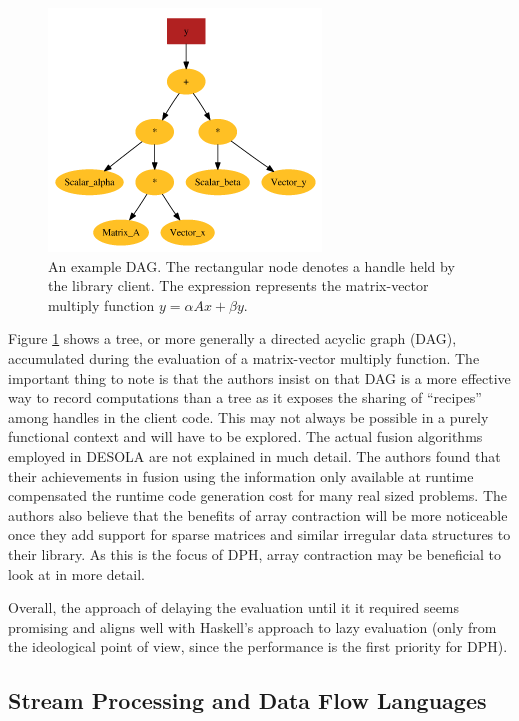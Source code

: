 \documentclass[preamble.tex]{subfiles}
\begin{document}
\begin{figure}
\begin{centering}
\includegraphics{img/DESOLA-running-example}
\par\end{centering}

\caption{\label{fig:Lib:DESOLA-DAG}{An example DAG. The rectangular node denotes a handle held by the library client. The expression represents the matrix-vector multiply function $y = \alpha Ax + \beta y$.}}
\end{figure}


Figure \ref{fig:Lib:DESOLA-DAG} shows a tree, or more generally a directed acyclic graph (DAG), accumulated during the evaluation of a matrix-vector multiply function. The important thing to note is that the authors insist on that DAG is a more effective way to record computations than a tree as it exposes the sharing of {}``recipes'' among handles in the client code. This may not always be possible in a purely functional context and will have to be explored. The actual fusion algorithms employed in DESOLA are not explained in much detail. The authors found that their achievements in fusion using the information only available at runtime compensated the runtime code generation cost for many real sized problems. The authors also believe that the benefits of array contraction will be more noticeable once they add support for sparse matrices and similar irregular data structures to their library. As this is the focus of DPH, array contraction may be beneficial to look at in more detail.

Overall, the approach of delaying the evaluation until it it required seems promising and aligns well with Haskell's approach to lazy evaluation (only from the ideological point of view, since the performance is the first priority for DPH).



\subsection{Stream Processing and Data Flow Languages}
\end{document}

